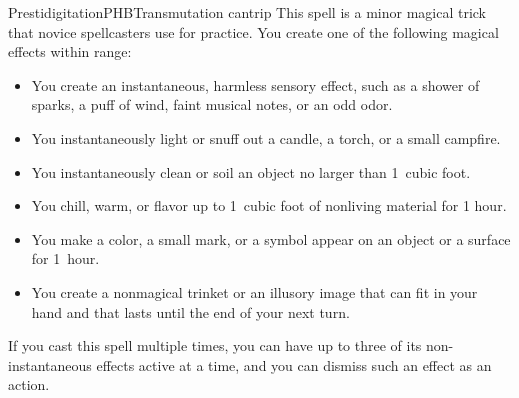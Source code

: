 \begin{spell}{Prestidigitation}{PHB}{Transmutation cantrip}
{
}
This spell is a minor magical trick that novice
spellcasters use for practice. You create one of the
following magical effects within range:

\begin{itemize}
\item You create an instantaneous, harmless sensory
    effect, such as a shower of sparks, a puff of wind,
    faint musi­cal notes, or an odd odor.
\item You instantaneously light or snuff out a candle,
    a torch, or a small campfire.
\item You instantaneously clean or soil an object no larger
    than 1~cubic foot.
\item You chill, warm, or flavor up to 1~cubic foot of
    nonliv­ing material for 1 hour.
\item You make a color, a small mark, or a symbol appear
    on an object or a surface for 1~hour.
\item You create a nonmagical trinket or an illusory image
    that can fit in your hand and that lasts until the end of
    your next turn.
\end{itemize}

If you cast this spell multiple times, you can have up to
three of its non-instantaneous effects active at a time,
and you can dismiss such an effect as an action.
\end{spell}
